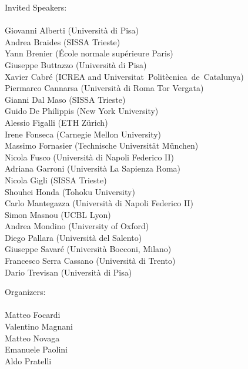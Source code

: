 \documentclass[a4paper]{article}
\newcommand{\bah}[1]{\textsf{#1}\\}
\begin{document}
\color{my}
\vspace{3cm}
\mbox{}\hspace{1cm}
\begin{minipage}{0.45\textwidth}
\Large
\bah{Invited Speakers:}
\\
\normalsize
\textsf{
Giovanni Alberti (Università di Pisa)\\
Andrea Braides (SISSA Trieste)\\
Yann Brenier (École normale supérieure Paris)\\
Giuseppe Buttazzo (Università di Pisa)\\
Xavier Cabré (ICREA and \mbox{Universitat~Politècnica~de~Catalunya)\hspace{-3cm}\mbox{}}\\
Piermarco Cannarsa (Università di Roma Tor Vergata)\\
Gianni Dal Maso (SISSA Trieste)\\
Guido De Philippis (New York University)\\
Alessio Figalli (ETH Zürich)\\
Irene Fonseca (Carnegie Mellon University)\\
Massimo Fornasier (Technische Universität München)\\
Nicola Fusco (Università di Napoli Federico II)\\
Adriana Garroni (Università La Sapienza Roma)\\
Nicola Gigli (SISSA Trieste)\\
Shouhei Honda (Tohoku University)\\
Carlo Mantegazza (Università di Napoli Federico II)\\
Simon Masnou (UCBL Lyon)\\
Andrea Mondino (University of Oxford)\\
Diego Pallara (Università del Salento)\\
Giuseppe Savaré (Università Bocconi, Milano)\\
Francesco Serra Cassano (Università di Trento)\\
Dario Trevisan (Università di Pisa)\\
}
\end{minipage}
\vspace{1.4cm}
\hspace{4cm}
\begin{minipage}{0.45\textwidth}
    \vspace{7cm}
    \Large
    \bah{Organizers:}
    \\
    \normalsize
    \textsf{
        Matteo Focardi\\
        Valentino Magnani\\
        Matteo Novaga\\
        Emanuele Paolini\\
        Aldo Pratelli
    }\\
    \end{minipage}
\end{document}
